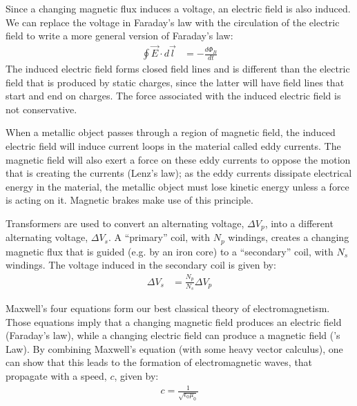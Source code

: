 \begin{chapterSummary}
Since a changing magnetic flux induces a voltage, an electric field is also induced. We can replace the voltage in Faraday's law with the circulation of the electric field to write a more general version of Faraday's law:
\begin{align*}
\oint \vec E\cdot d\vec l &= -\frac{d\Phi_B}{dt}
\end{align*}
The induced electric field forms closed field lines and is different than the electric field that is produced by static charges, since the latter will have field lines that start and end on charges. The force associated with the induced electric field is not conservative.

When a metallic object passes through a region of magnetic field, the induced electric field will induce current loops in the material called eddy currents. The magnetic field will also exert a force on these eddy currents to oppose the motion that is creating the currents (Lenz's law); as the eddy currents dissipate electrical energy in the material, the metallic object must lose kinetic energy unless a force is acting on it. Magnetic brakes make use of this principle.

Transformers are used to convert an alternating voltage, $\Delta V_p$, into a different alternating voltage, $\Delta V_s$. A ``primary'' coil, with $N_p$ windings, creates a changing magnetic flux that is guided (e.g. by an iron core) to a ``secondary'' coil, with $N_s$ windings. The voltage induced in the secondary coil is given by:
\begin{align*}
\Delta V_s &= \frac{N_p}{N_s}\Delta V_p
\end{align*}

Maxwell's four equations form our best classical theory of electromagnetism. Those equations imply that a changing magnetic field produces an electric field (Faraday's law), while a changing electric field can produce a magnetic field (\ampere's Law). By combining Maxwell's equation (with some heavy vector calculus), one can show that this leads to the formation of electromagnetic waves, that propagate with a speed, $c$, given by:
\begin{align*}
c = \frac{1}{\sqrt{\epsilon_0\mu_0}}
\end{align*}

\end{chapterSummary}

